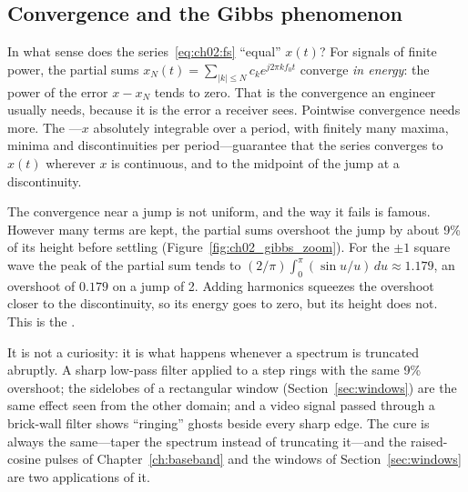\subsection{Convergence and the Gibbs phenomenon}

In what sense does the series~\eqref{eq:ch02:fs} ``equal'' $x(t)$? For signals of finite power, the
partial sums $x_N(t)=\sum_{|k|\le N}c_ke^{j2\pi kf_0t}$ converge \emph{in energy}: the power of the
error $x-x_N$ tends to zero. That is the convergence an engineer usually needs, because it is the
error a receiver sees. Pointwise convergence needs more. The ---$x$
absolutely integrable over a period, with finitely many maxima, minima and discontinuities per
period---guarantee that the series converges to $x(t)$ wherever $x$ is continuous, and to the
midpoint of the jump at a discontinuity.

The convergence near a jump is not uniform, and the way it fails is famous. However many terms
are kept, the partial sums overshoot the jump by about 9\% of its height before settling
(Figure~\ref{fig:ch02_gibbs_zoom}). For the $\pm1$ square wave the peak of the partial sum
tends to $(2/\pi)\int_0^\pi(\sin u/u)\,du\approx1.179$, an overshoot of $0.179$ on a jump of 2. Adding
harmonics squeezes the overshoot closer to the discontinuity, so its energy goes to zero, but its
height does not. This is the .


It is not a curiosity: it is what happens whenever a spectrum is truncated abruptly. A sharp
low-pass filter applied to a step rings with the same 9\% overshoot; the sidelobes of a rectangular
window (Section~\ref{sec:windows}) are the same effect seen from the other domain; and a video signal
passed through a brick-wall filter shows ``ringing'' ghosts beside every sharp edge. The cure is
always the same---taper the spectrum instead of truncating it---and the raised-cosine pulses of
Chapter~\ref{ch:baseband} and the windows of Section~\ref{sec:windows} are two applications of it.


